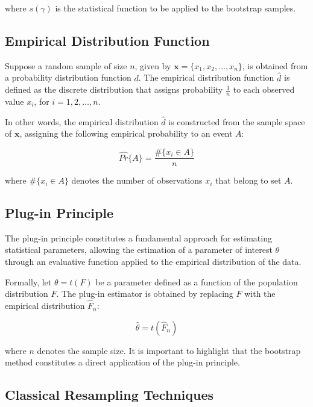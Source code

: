\documentclass[12pt]{article}
\begin{document}
\noindent where $s(\gamma)$ is the statistical function to be applied to the bootstrap samples.

\subsection{Empirical Distribution Function}

Suppose a random sample of size $n$, given by $\mathbf{x} = \{x_1, x_2, \ldots, x_n\}$, is obtained from a probability distribution function $d$. The empirical distribution function $\hat{d}$ is defined as the discrete distribution that assigns probability $\frac{1}{n}$ to each observed value $x_i$, for $i = 1, 2, \ldots, n$.

In other words, the empirical distribution $\hat{d}$ is constructed from the sample space of $\mathbf{x}$, assigning the following empirical probability to an event $A$:

\begin{equation}
\hat{Pr}\{A\} = \frac{\#\{x_i \in A\}}{n}
\end{equation}

\noindent where $\#\{x_i \in A\}$ denotes the number of observations $x_i$ that belong to set $A$.

\subsection{Plug-in Principle}

The plug-in principle constitutes a fundamental approach for estimating statistical parameters, allowing the estimation of a parameter of interest $\theta$ through an evaluative function applied to the empirical distribution of the data.

Formally, let $\theta = t(F)$ be a parameter defined as a function of the population distribution $F$. The plug-in estimator is obtained by replacing $F$ with the empirical distribution $\hat{F}_n$:

\begin{equation}
\hat{\theta} = t(\hat{F}_n)
\end{equation}

\noindent where $n$ denotes the sample size. It is important to highlight that the bootstrap method constitutes a direct application of the plug-in principle.\cite{EFRON:1993, Fernandez:1999}

\subsection{Classical Resampling Techniques}
\end{document}
